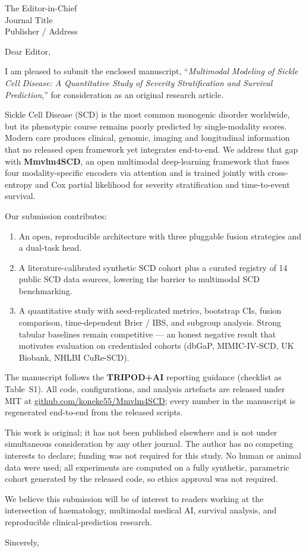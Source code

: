 \documentclass[11pt,a4paper]{letter}
\begin{document}
\begin{letter}{The Editor-in-Chief\\Journal Title\\Publisher / Address}

\opening{Dear Editor,}

I am pleased to submit the enclosed manuscript, ``\textit{Multimodal
Modeling of Sickle Cell Disease: A Quantitative Study of Severity
Stratification and Survival Prediction},'' for consideration as an
original research article.

Sickle Cell Disease (SCD) is the most common monogenic disorder
worldwide, but its phenotypic course remains poorly predicted by
single-modality scores. Modern care produces clinical, genomic,
imaging and longitudinal information that no released open framework
yet integrates end-to-end. We address that gap with
\textbf{Mmvlm4SCD}, an open multimodal deep-learning framework that
fuses four modality-specific encoders via attention and is trained
jointly with cross-entropy and Cox partial likelihood for severity
stratification and time-to-event survival.

Our submission contributes:
\begin{enumerate}
  \item An open, reproducible architecture with three pluggable
        fusion strategies and a dual-task head.
  \item A literature-calibrated synthetic SCD cohort plus a curated
        registry of 14 public SCD data sources, lowering the barrier
        to multimodal SCD benchmarking.
  \item A quantitative study with seed-replicated metrics, bootstrap
        CIs, fusion comparison, time-dependent Brier / IBS, and
        subgroup analysis. Strong tabular baselines remain
        competitive --- an honest negative result that motivates
        evaluation on credentialed cohorts (dbGaP, MIMIC-IV-SCD,
        UK Biobank, NHLBI CuRe-SCD).
\end{enumerate}

The manuscript follows the \textbf{TRIPOD+AI} reporting guidance
(checklist as Table~S1). All code, configurations, and analysis
artefacts are released under MIT at
\href{https://github.com/koneke55/Mmvlm4SCD}
{github.com/koneke55/Mmvlm4SCD}; every number in the manuscript is
regenerated end-to-end from the released scripts.

This work is original; it has not been published elsewhere and is not
under simultaneous consideration by any other journal. The author has
no competing interests to declare; funding was not required for this
study.
No human or animal data were used; all experiments are computed on a
fully synthetic, parametric cohort generated by the released code, so
ethics approval was not required.

We believe this submission will be of interest to readers working at
the intersection of haematology, multimodal medical AI, survival
analysis, and reproducible clinical-prediction research.

\closing{Sincerely,}

\end{letter}
\end{document}
